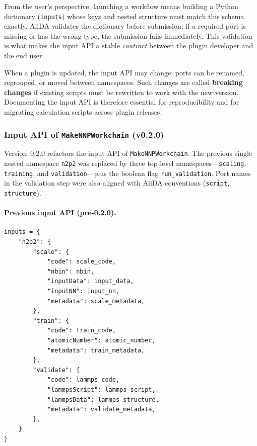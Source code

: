 From the user's perspective, launching a workflow means building a Python dictionary
(\texttt{inputs}) whose keys and nested structure must match this schema exactly.
AiiDA validates the dictionary before submission; if a required port is missing or
has the wrong type, the submission fails immediately.
This validation is what makes the input API a stable \emph{contract} between the
plugin developer and the end user.

When a plugin is updated, the input API may change: ports can be renamed, regrouped,
or moved between namespaces.
Such changes are called \textbf{breaking changes} if existing scripts must be
rewritten to work with the new version.
Documenting the input API is therefore essential for reproducibility and for
migrating calculation scripts across plugin releases.

\subsubsection{Input API of \texttt{MakeNNPWorkchain} (v0.2.0)}

Version~0.2.0 refactors the input API of \texttt{MakeNNPWorkchain}.
The previous single nested namespace \texttt{n2p2} was replaced by three top-level
namespaces---\texttt{scaling}, \texttt{training}, and \texttt{validation}---plus the
boolean flag \texttt{run\_validation}.
Port names in the validation step were also aligned with AiiDA conventions
(\texttt{script}, \texttt{structure}).

\paragraph{Previous input API (pre-0.2.0).}
\begin{lstlisting}
inputs = {
    "n2p2": {
        "scale": {
            "code": scale_code,
            "nbin": nbin,
            "inputData": input_data,
            "inputNN": input_nn,
            "metadata": scale_metadata,
        },
        "train": {
            "code": train_code,
            "atomicNumber": atomic_number,
            "metadata": train_metadata,
        },
        "validate": {
            "code": lammps_code,
            "lammpsScript": lammps_script,
            "lammpsData": lammps_structure,
            "metadata": validate_metadata,
        },
    }
}
\end{lstlisting}

